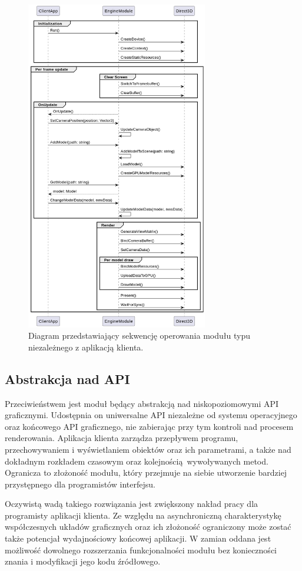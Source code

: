 \begin{figure}[ht!]
	\centering
	\includegraphics[width=300px]{uml/module_type_engine.png}
	\caption{Diagram przedstawiający sekwencję operowania modułu typu niezależnego z aplikacją klienta.}
	\label{UML_Sequence_Module_Engine}
\end{figure}

\vfill
\clearpage

\subsection{Abstrakcja nad API}
\label{Subsection_module_types_abstraction}
Przeciwieństwem jest moduł będący abstrakcją nad niskopoziomowymi API graficznymi. Udostępnia on uniwersalne API niezależne od systemu operacyjnego oraz końcowego API graficznego, nie zabierając przy tym kontroli nad procesem renderowania. Aplikacja klienta zarządza przepływem programu, przechowywaniem i wyświetlaniem obiektów oraz ich parametrami, a także nad dokładnym rozkładem czasowym oraz kolejnością wywoływanych metod. Ogranicza to złożoność modułu, który przejmuje na siebie utworzenie bardziej przystępnego dla programistów interfejsu.

Oczywistą wadą takiego rozwiązania jest zwiększony nakład pracy dla programisty aplikacji klienta. Ze względu na asynchroniczną charakterystykę współczesnych układów graficznych oraz ich złożoność ograniczony może zostać także potencjał wydajnościowy końcowej aplikacji. W zamian oddana jest możliwość dowolnego rozszerzania funkcjonalności modułu bez konieczności znania i modyfikacji jego kodu źródłowego.

